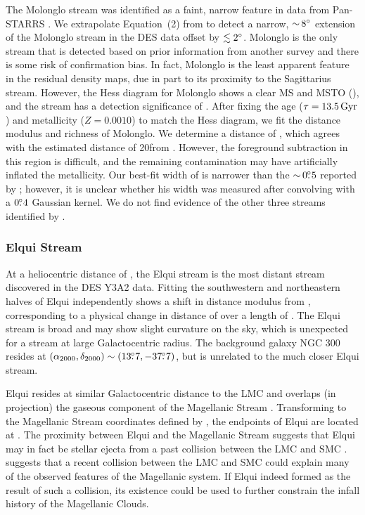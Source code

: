 \documentclass[twocolumn]{aastex61}
\begin{document}
The Molonglo stream was identified as a faint, narrow feature in data from Pan-STARRS \citep{Grillmair:2017}.
We extrapolate Equation~(2) from \citet{Grillmair:2017} to detect a narrow, $ {\sim}\, 8{}^{\circ}$ extension of the Molonglo stream in the DES data offset by $\lesssim 2 {}^{\circ}$.
Molonglo is the only stream that is detected based on prior information from another survey and there is some risk of confirmation bias.
In fact, Molonglo is the least apparent feature in the residual density maps, due in part to its proximity to the Sagittarius stream.
However, the Hess diagram for Molonglo shows a clear MS and MSTO (), and the stream has a detection significance of \CHECK{$5.2\sigma$}.
After fixing the age (${\tau} = 13.5\mathrm{\,Gyr}$) and metallicity ($Z=0.0010$) to match the Hess diagram, we fit the distance modulus and richness of Molonglo.
We determine a distance of , which agrees with the estimated distance of 20\kpc from \citet{Grillmair:2017}.
However, the foreground subtraction in this region is difficult, and the remaining contamination may have artificially inflated the metallicity.
Our best-fit width of  is narrower than the $ {\sim}\,0\mbox{$.\!\!^\circ$}5$ reported by \citet{Grillmair:2017}; however, it is unclear whether his width was measured after convolving with a $0\mbox{$.\!\!^\circ$}4$ Gaussian kernel.
We do not find evidence of the other three streams identified by \citet{Grillmair:2017}.

\subsubsection{Elqui Stream}
\label{sec:elqui}

At a heliocentric distance of , the Elqui stream is the most distant stream discovered in the DES Y3A2 data.
Fitting the southwestern and northeastern halves of Elqui independently shows a shift in distance modulus from , corresponding to a physical change in distance of \CHECK{6.5 \kpc} over a length of \CHECK{8.2 \kpc}.
The Elqui stream is broad and may show slight curvature on the sky, which is unexpected for a stream at large Galactocentric radius. 
The background galaxy NGC 300 resides at $({\alpha_{2000}},{\delta_{2000}}) \sim (13\mbox{$.\!\!^\circ$}7,-37\mbox{$.\!\!^\circ$}7)$, but is unrelated to the much closer Elqui stream.

Elqui resides at similar Galactocentric distance to the LMC and overlaps (in projection) the gaseous component of the Magellanic Stream \citep{Nidever:2008}.
Transforming to the Magellanic Stream coordinates defined by \citet{Nidever:2008}, the endpoints of Elqui are located at .
The proximity between Elqui and the Magellanic Stream suggests that Elqui may in fact be stellar ejecta from a past collision between the LMC and SMC \citep{Besla:2010,Besla:2012}.
\citet{Besla:2012} suggests that a recent collision between the LMC and SMC could explain many of the observed features of the Magellanic system.
If Elqui indeed formed as the result of such a collision, its existence could be used to further constrain the infall history of the Magellanic Clouds.
\end{document}
